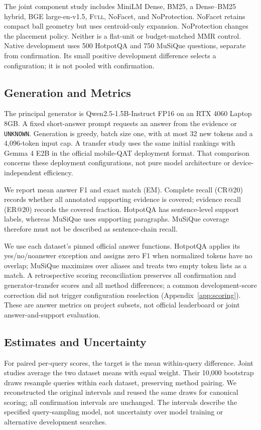 \documentclass[11pt]{article}
\newcommand{\full}{\textsc{Full}\xspace}
\begin{document}
The joint component study includes MiniLM Dense, BM25, a Dense--BM25 hybrid,
BGE large-en-v1.5, \full, NoFacet, and NoProtection.
NoFacet retains compact ball geometry but uses centroid-only expansion.
NoProtection changes the placement policy. Neither is a flat-unit or
budget-matched MMR control.
Native development uses 500 HotpotQA and 750 MuSiQue questions, separate from
confirmation. Its small positive development difference selects a
configuration; it is not pooled with confirmation.

\subsection{Generation and Metrics}
The principal generator is Qwen2.5-1.5B-Instruct FP16 on an RTX 4060 Laptop
8GB. A fixed short-answer prompt requests an answer from the evidence or
\texttt{UNKNOWN}. Generation is greedy, batch size one, with at most 32 new
tokens and a 4,096-token input cap. A transfer study uses the same initial
rankings with Gemma 4 E2B in the official mobile-QAT deployment format.
That comparison concerns these deployment configurations, not pure model
architecture or device-independent efficiency.

We report mean answer F1 and exact match (EM). Complete recall (CR@20)
records whether all annotated supporting evidence is covered; evidence recall
(ER@20) records the covered fraction. HotpotQA has sentence-level support
labels, whereas MuSiQue uses supporting paragraphs. MuSiQue coverage therefore
must not be described as sentence-chain recall.

We use each dataset's pinned official answer functions. HotpotQA applies
its yes/no/noanswer exception and assigns zero
F1 when normalized tokens have no overlap; MuSiQue maximizes over aliases
and treats two empty token lists as a match. A retrospective scoring
reconciliation preserves all confirmation and generator-transfer scores and
all method differences; a common development-score correction did not trigger
configuration reselection (Appendix~\ref{app:scoring}). These are answer
metrics on project subsets, not official leaderboard or joint
answer-and-support evaluation.

\subsection{Estimates and Uncertainty}
For paired per-query scores, the target is the mean within-query difference.
Joint studies average the two dataset means with equal weight. Their 10,000
bootstrap draws resample queries within each dataset, preserving method
pairing. We reconstructed the original intervals and reused the same draws
for canonical scoring; all confirmation intervals are unchanged.
The intervals describe the specified query-sampling model,
not uncertainty over model training or alternative development searches.
\end{document}
